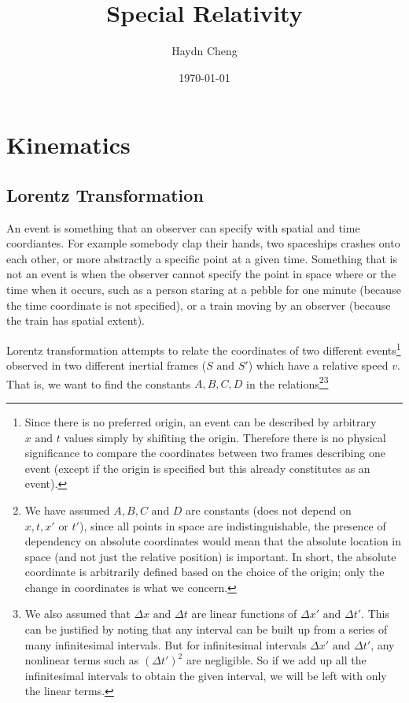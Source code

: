 \documentclass[english,a4paper,12pt]{report}
\title{Special Relativity}
\author{Haydn Cheng}
\date{\today}
\begin{document}
\maketitle
\tableofcontents

\chapter{Kinematics}

\section{Lorentz Transformation}

An event is something that an observer can specify with spatial and time coordiantes. For example somebody clap their hands, two spaceships crashes onto each other, or more abstractly a specific point at a given time. Something that is not an event is when the observer cannot specify the point in space where or the time when it occurs, such as a person staring at a pebble for one minute (because the time coordinate is not specified), or a train moving by an observer (because the train has spatial extent).

Lorentz transformation attempts to relate the coordinates of two different events\footnote{Since there is no preferred origin, an event can be described by arbitrary \(x \text { and } t\) values simply by shifiting the origin. Therefore there is no physical significance to compare the coordinates between two frames describing one event (except if the origin is specified but this already constitutes as an event).} observed in two different inertial frames (\(S \text { and } S'\)) which have a relative speed \(v\). That is, we want to find the constants \(A, B, C, D\) in the relations\footnote{We have assumed \(A, B, C \text { and } D\) are constants (does not depend on \(x, t, x' \text { or } t'\)), since all points in space are indistinguishable, the presence of dependency on absolute coordinates would mean that the absolute location in space (and not just the relative position) is important. In short, the absolute coordinate is arbitrarily defined based on the choice of the origin; only the change in coordinates is what we concern.}\footnote{We also assumed that \(\Delta x \text { and } \Delta t\) are linear functions of \(\Delta x' \text { and }  \Delta t'\). This can be justified by noting that any interval can be built up from a series of many infinitesimal intervals. But for infinitesimal intervals \(\Delta x' \text { and } \Delta t'\), any nonlinear terms such as \((\Delta t')^2\) are negligible. So if we add up all the infinitesimal intervals to obtain the given interval, we will be left with only the linear terms.}  
\end{document}
